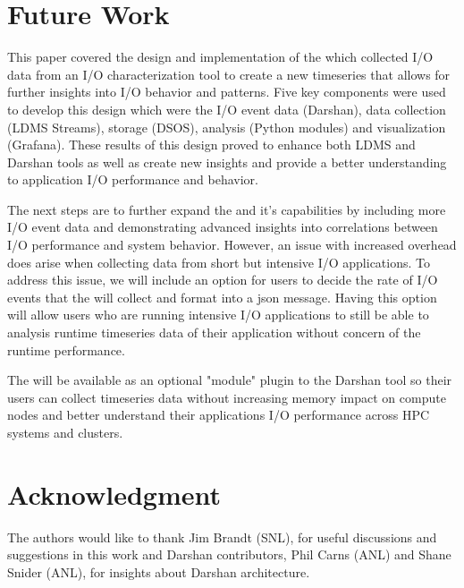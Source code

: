 \section{Future Work}
\label{sec:conclusion}
This paper covered the \Darshan{} design and implementation of the \connector{} which collected I/O data from an I/O characterization tool to create a new timeseries that allows for further insights into I/O behavior and patterns. Five key components were used to develop this design which were the I/O event data (Darshan), data collection (LDMS Streams), storage (DSOS), analysis (Python modules) and visualization (Grafana).
These results of this design proved to enhance both LDMS and Darshan tools as well as create new insights and provide a better understanding to application I/O performance and behavior. 

The next steps are to further expand the \connector{} and it's capabilities by including more I/O event data and demonstrating advanced insights into correlations between I/O performance and system behavior. However, an
issue with increased overhead does arise when collecting data
from short but intensive I/O applications. 
To address this issue, we will include an option for users to decide the rate of I/O events that the \connector{} will collect and format into a json message. Having this option will allow users who are running intensive I/O applications to still be able to analysis runtime timeseries data of their application without concern of the runtime performance. 

The \Darshan{} will be available as an optional "module" plugin to the Darshan tool so their users can collect timeseries data without increasing memory impact on compute nodes and better understand their applications I/O performance across HPC systems and clusters. 

\section{Acknowledgment}
The authors would like to thank Jim Brandt (SNL), for useful discussions and suggestions in this work and Darshan contributors, Phil Carns (ANL) and Shane Snider (ANL), for insights about Darshan architecture.



